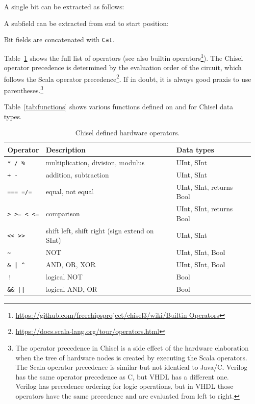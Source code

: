 \documentclass[%
    10pt,
    headinclude, footexclude,
    openright, %
    notitlepage,
    cleardoubleempty,
    headsepline,
    pointlessnumbers,
    bibtotoc, idxtotoc,
    ]{scrbook}
\newcommand{\code}[1]{{\small{\texttt{#1}}}}
\newcommand{\myref}[2]{\href{#1}{#2}}
\renewcommand{\myref}[2]{{#2}{\footnote{\url{#1}}}}
\begin{document}

A single bit can be extracted as follows:

\noindent A subfield can be extracted from end to start position:

\noindent Bit fields are concatenated with \code{Cat}.

Table~\ref{tab:operators} shows the full list of operators
(see also \myref{https://github.com/freechipsproject/chisel3/wiki/Builtin-Operators}{builtin operators}).
The Chisel operator precedence is determined by the evaluation order of the circuit,
which follows the \myref{https://docs.scala-lang.org/tour/operators.html}{Scala operator precedence}.
If in doubt, it is always good praxis to use parentheses.\footnote{The operator precedence in
Chisel is a side effect of the hardware elaboration when the tree of hardware nodes
is created by executing the Scala operators. The Scala operator precedence is similar but
not identical to Java/C. Verilog has the same operator precedence as C, but VHDL
has a different one. Verilog has precedence ordering for logic operations, but in VHDL
those operators have the same precedence and are evaluated from left to right.}

Table~\ref{tab:functions} shows various functions defined on and for Chisel data types.

\begin{table}
 \centering
 \label{tab:operators}
  \begin{tabular}{lll}
    \toprule
    Operator & Description & Data types \\
    \midrule
    \code{* / \%} & multiplication, division, modulus & UInt, SInt \\
    \code{+ -} & addition, subtraction & UInt, SInt \\
    \code{=== =/=} & equal, not equal & UInt, SInt, returns Bool \\
    \code{> >= < <=} & comparison & UInt, SInt, returns Bool \\
    \code{<< >>} & shift left, shift right (sign extend on SInt) & UInt, SInt \\
    \code{\~} & NOT & UInt, SInt, Bool \\
    \code{\& | \^} & AND, OR, XOR & UInt, SInt, Bool \\
    \code{!} & logical NOT & Bool \\
    \code{\&\& ||} & logical AND, OR & Bool \\
    \bottomrule 
  \end{tabular} 
  \caption{Chisel defined hardware operators.}
\end{table}
\end{document}
